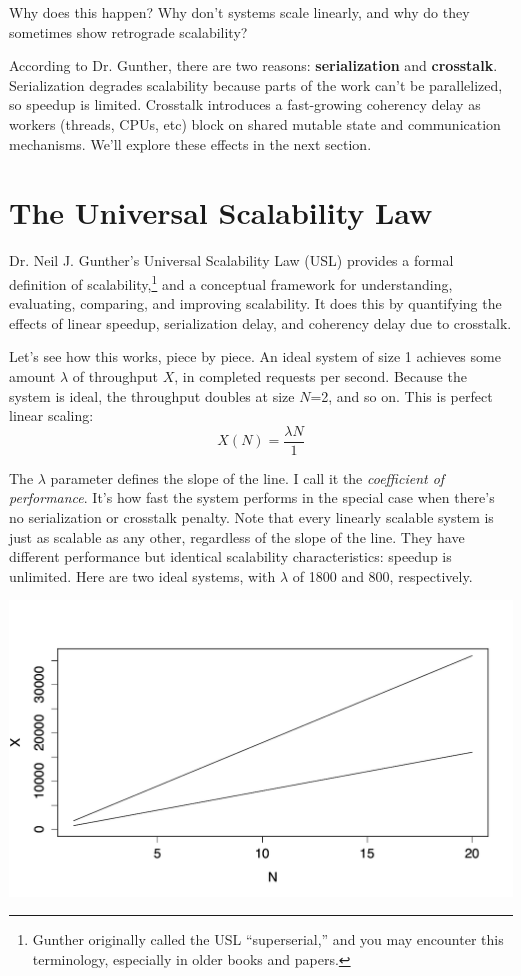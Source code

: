 \documentclass{vivid_layout}
\begin{document}
Why does this happen? Why don't systems scale linearly, and why do they
sometimes show retrograde scalability?

According to Dr. Gunther, there are two reasons: {\bfseries serialization} and
{\bfseries crosstalk}. Serialization degrades scalability because parts of the
work can't be parallelized, so speedup is limited. Crosstalk introduces a
fast-growing coherency delay as workers (threads, CPUs, etc) block on shared
mutable state and communication mechanisms. We'll explore these effects in the
next section.

\section{The Universal Scalability Law}

Dr. Neil J. Gunther's Universal Scalability Law (USL) provides a formal
definition of scalability,\footnote{Gunther originally called the USL
``superserial,'' and you may encounter this terminology, especially in older
books and papers.} and a conceptual framework for understanding,
evaluating, comparing, and improving scalability. It does this by quantifying
the effects of linear speedup, serialization delay, and coherency delay due to
crosstalk.

Let's see how this works, piece by piece. An ideal system of size 1
achieves some amount $\lambda$ of throughput $X$, in completed requests per
second. Because the system is ideal, the throughput doubles at size $N$=2, and so
on. This is perfect linear scaling:
\[
X(N) = \frac{\lambda N}{1}
\]

The $\lambda$ parameter defines the slope of the line. I call it the {\itshape
coefficient of performance}. It's how fast the system performs in the special
case when there's no serialization or crosstalk penalty.  Note that every
linearly scalable system is just as scalable as any other, regardless of the
slope of the line. They have different performance but identical scalability
characteristics: speedup is unlimited. Here are two ideal systems, with
$\lambda$ of 1800 and 800, respectively.
\begin{center}
\includegraphics[width=.85\linewidth]{scalability/ideal-linear}
\end{center}
\end{document}

